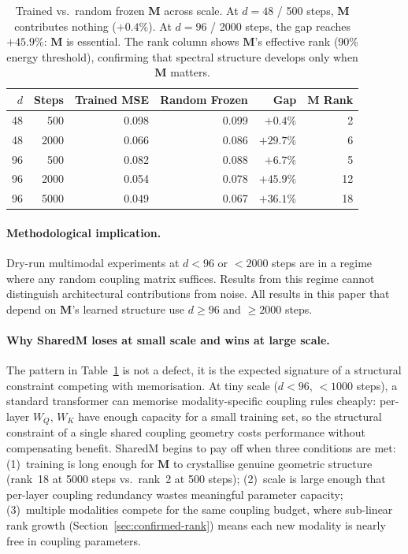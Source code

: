 \documentclass[11pt, a4paper]{article}
\newcommand{\M}{\mathbf{M}}
\theoremstyle{plain}
\theoremstyle{remark}
\begin{document}
\begin{table}[h]
\centering
\small
\begin{tabular}{@{}rrrrrr@{}}
\toprule
\textbf{$d$} & \textbf{Steps} & \textbf{Trained MSE} & \textbf{Random Frozen} & \textbf{Gap} & \textbf{$\M$ Rank} \\
\midrule
48 & 500 & 0.098 & 0.099 & $+0.4\%$ & 2 \\
48 & 2000 & 0.066 & 0.086 & $+29.7\%$ & 6 \\
96 & 500 & 0.082 & 0.088 & $+6.7\%$ & 5 \\
96 & 2000 & 0.054 & 0.078 & $+45.9\%$ & 12 \\
96 & 5000 & 0.049 & 0.067 & $+36.1\%$ & 18 \\
\bottomrule
\end{tabular}
\caption{Trained vs.\ random frozen $\M$ across scale.  At $d{=}48$ / 500 steps, $\M$ contributes nothing ($+0.4\%$).  At $d{=}96$ / 2000 steps, the gap reaches $+45.9\%$: $\M$ is essential.  The rank column shows $\M$'s effective rank (90\% energy threshold), confirming that spectral structure develops only when $\M$ matters.}
\label{tab:when-m-matters}
\end{table}

\paragraph{Methodological implication.}
Dry-run multimodal experiments at $d < 96$ or $< 2000$ steps are in a regime where any random coupling matrix suffices.
Results from this regime cannot distinguish architectural contributions from noise.
All results in this paper that depend on $\M$'s learned structure use $d \geq 96$ and $\geq 2000$ steps.

\paragraph{Why SharedM loses at small scale and wins at large scale.}
The pattern in Table~\ref{tab:when-m-matters} is not a defect, it is the expected signature of a structural constraint competing with memorisation.
At tiny scale ($d < 96$, $< 1000$ steps), a standard transformer can memorise modality-specific coupling rules cheaply: per-layer $W_Q$, $W_K$ have enough capacity for a small training set, so the structural constraint of a single shared coupling geometry costs performance without compensating benefit.
SharedM begins to pay off when three conditions are met:
(1)~training is long enough for $\M$ to crystallise genuine geometric structure (rank~18 at 5000 steps vs.\ rank~2 at 500 steps);
(2)~scale is large enough that per-layer coupling redundancy wastes meaningful parameter capacity;
(3)~multiple modalities compete for the same coupling budget, where sub-linear rank growth (Section~\ref{sec:confirmed-rank}) means each new modality is nearly free in coupling parameters.
\end{document}
